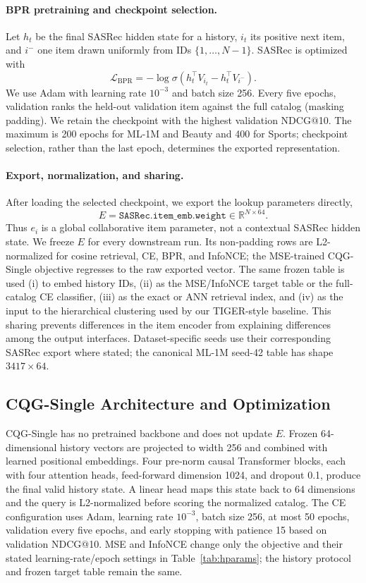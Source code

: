 \documentclass[letterpaper]{article}
\begin{document}
\paragraph{BPR pretraining and checkpoint selection.}
Let \(h_t\) be the final SASRec hidden state for a history, \(i_t\) its
positive next item, and \(i^-\) one item drawn uniformly from IDs
\(\{1,\ldots,N-1\}\).  SASRec is optimized with
\[
  \mathcal L_{\mathrm{BPR}}
  =-\log\sigma(h_t^\top V_{i_t}-h_t^\top V_{i^-}).
\]
We use Adam with learning rate \(10^{-3}\) and batch size 256.  Every five
epochs, validation ranks the held-out validation item against the full
catalog (masking padding).  We retain the checkpoint with the highest
validation NDCG@10.  The maximum is 200 epochs for ML-1M and Beauty and 400
for Sports; checkpoint selection, rather than the last epoch, determines the
exported representation.

\paragraph{Export, normalization, and sharing.}
After loading the selected checkpoint, we export the lookup parameters
directly,
\[
  E=\texttt{SASRec.item\_emb.weight}\in\mathbb{R}^{N\times64}.
\]
Thus \(e_i\) is a global collaborative item parameter, not a contextual
SASRec hidden state.  We freeze \(E\) for every downstream run.  Its
non-padding rows are L2-normalized for cosine retrieval, CE, BPR, and
InfoNCE; the MSE-trained CQG-Single objective regresses to the raw exported
vector.  The same frozen table is used (i) to embed history IDs,
(ii) as the MSE/InfoNCE target table or the full-catalog CE classifier,
(iii) as the exact or ANN retrieval index, and (iv) as the input to the
hierarchical clustering used by our TIGER-style baseline.  This sharing
prevents differences in the item encoder from explaining differences among
the output interfaces.  Dataset-specific seeds use their corresponding
SASRec export where stated; the canonical ML-1M seed-42 table has shape
\(3417\times64\).

\subsection{CQG-Single Architecture and Optimization}
\label{app:cqg-single-training}

CQG-Single has no pretrained backbone and does not update \(E\).  Frozen
64-dimensional history vectors are projected to width 256 and combined with
learned positional embeddings.  Four pre-norm causal Transformer blocks,
each with four attention heads, feed-forward dimension 1024, and dropout 0.1,
produce the final valid history state.  A linear head maps this state back to
64 dimensions and the query is L2-normalized before scoring the normalized
catalog.  The CE configuration uses Adam, learning rate \(10^{-3}\), batch
size 256, at most 50 epochs, validation every five epochs, and early stopping
with patience 15 based on validation NDCG@10.  MSE and InfoNCE change only
the objective and their stated learning-rate/epoch settings in
Table~\ref{tab:hparams}; the history protocol and frozen target table remain
the same.
\end{document}
